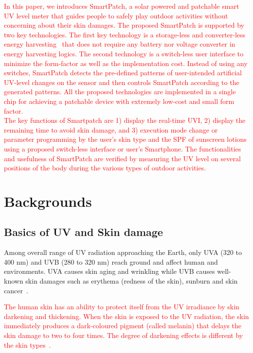 \documentclass[journal]{IEEEtran}
\begin{document}
\textcolor{red}{In this paper, we introduces SmartPatch, a solar powered  and patchable smart UV level meter that guides people to safely play outdoor activities without concerning about their skin damages. The proposed SmartPatch is supported by two key technologies. The first key technology is a storage-less and converter-less energy harvesting~\cite{Lee:ASPDAC15} that does not require any battery nor voltage converter in energy harvesting logics. The second technology is a switch-less user interface to minimize the form-factor as well as the implementation cost. Instead of using any switches, SmartPatch detects the pre-defined patterns of user-intended artificial UV-level changes on the sensor and then controls SmartPatch according to the generated patterns. All the proposed technologies are implemented in a single chip for achieving a patchable device with extremely low-cost and small form factor.\\
% 
The key functions of Smartpatch are 1) display the real-time UVI, 2) display the remaining time to avoid skin damage, and 3) execution mode change or parameter programming by the user's skin type and the SPF of sunscreen lotions using a proposed switch-less interface or user's Smartphone. The functionalities and usefulness of SmartPatch are verified by measuring the UV level on several positions of the body during the various types of outdoor activities.}

\section{Backgrounds}
\subsection{Basics of UV and Skin damage}

Among overall range of UV radiation approaching the Earth, only UVA (320 to 400 nm) and UVB (280 to 320 nm) reach ground and affect human and environments. UVA causes skin aging and wrinkling while UVB causes well-known skin damages such as erythema (redness of the skin), sunburn and skin cancer~\cite{Matsumura:TAP04}.

\textcolor{red}{The human skin has an ability to protect itself from the UV irradiance by skin darkening and thickening.
When the skin is exposed to the UV radiation, the skin immediately produces a dark-coloured pigment (called melanin) that delays the skin damage to two to four times. The degree of darkening effects is different by the skin types~\cite{Harrison:Method02}.}
\end{document}
